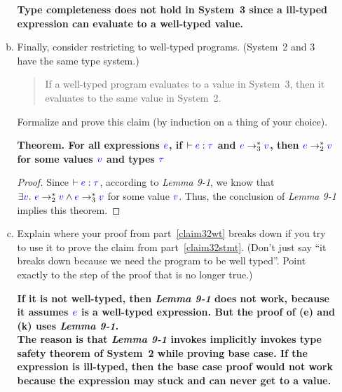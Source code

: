 \documentclass{article}
\newcommand{\meta}[1]{{\color{blue}#1}}
\begin{document}
\begin{enumerate}[leftmargin=*,itemindent=*,start=6,label={{\bf Problem \arabic*}.},ref=\arabic*]
\begin{enumerate}[(a)]
    \textbf {
      Type completeness does not hold in System~3 since a ill-typed expression can evaluate to a well-typed value.      
    }

  \item\label{claim32wt} Finally, consider restricting to well-typed programs. (System~2 and 3 have the same type system.)
    \begin{quote}
      If a well-typed program evaluates to a value in System~3, then it evaluates to the same value in System~2.
    \end{quote}
    Formalize and prove this claim (by induction on a thing of your choice).

    \textbf{
      Theorem. For all expressions $\meta{e}$, if $\vdash \meta{e} : \meta{\tau}$ and $\meta{e} \to_3^* \meta{v}$, then $\meta{e} \to_2^* \meta{v}$ for some values $\meta{v}$ and types $\meta{\tau}$
    }
    \begin{proof}
      Since $\vdash \meta{e} : \meta{\tau}$, according to \textit{Lemma 9-1}, we know that $\exists \meta{v}.\ \meta{e} \to_2^* \meta{v} \wedge \meta{e} \to_3^* \meta{v}$ for some value $\meta{v}$. Thus, the conclusion of \textit{Lemma 9-1} implies this theorem.
    \end{proof}
      \item Explain where your proof from part~\ref{claim32wt} breaks down if you try to use it
    to prove the claim from part~\ref{claim32stmt}. (Don't just say ``it breaks down because
    we need the program to be well typed''. Point exactly to the step of the proof that is
    no longer true.)

      \textbf{
        If it is not well-typed, then \textit{Lemma 9-1} does not work, because it assumes $\meta{e}$ is a well-typed expression. But the proof of (e) and (k) uses \textit{Lemma 9-1}.\\
        The reason is that \textit{Lemma 9-1} invokes implicitly invokes type safety theorem of System~2 while proving base case. If the expression is ill-typed, then the base case proof would not work because the expression may stuck and can never get to a value.
      }

  \end{enumerate}
\end{enumerate}
\end{document}
